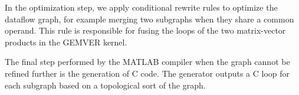 \documentclass[runningheads]{llncs}
\begin{document}

In the optimization step, we apply conditional rewrite rules to optimize the
dataflow graph, for example merging two subgraphs when they share a common
operand.
This rule is responsible for fusing the loops of the two
matrix-vector products in the GEMVER kernel.  




The final step performed by the MATLAB compiler when the graph cannot be
refined further is the generation of C code. The generator outputs a C loop
for each subgraph based on a topological sort of the graph. 
\end{document}

